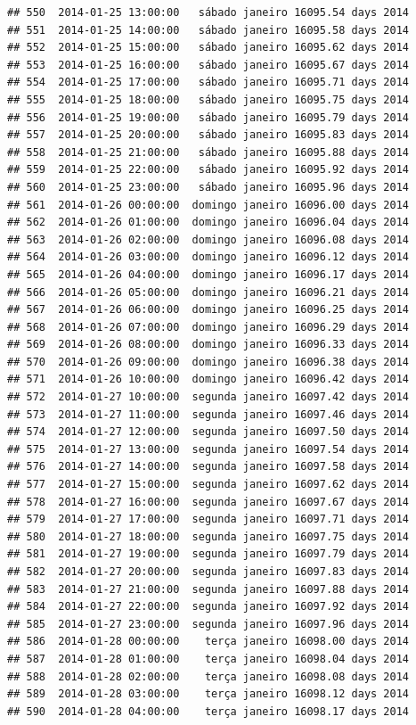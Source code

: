 \documentclass[]{book}
\begin{document}
\begin{verbatim}
## 550  2014-01-25 13:00:00   sábado janeiro 16095.54 days 2014
## 551  2014-01-25 14:00:00   sábado janeiro 16095.58 days 2014
## 552  2014-01-25 15:00:00   sábado janeiro 16095.62 days 2014
## 553  2014-01-25 16:00:00   sábado janeiro 16095.67 days 2014
## 554  2014-01-25 17:00:00   sábado janeiro 16095.71 days 2014
## 555  2014-01-25 18:00:00   sábado janeiro 16095.75 days 2014
## 556  2014-01-25 19:00:00   sábado janeiro 16095.79 days 2014
## 557  2014-01-25 20:00:00   sábado janeiro 16095.83 days 2014
## 558  2014-01-25 21:00:00   sábado janeiro 16095.88 days 2014
## 559  2014-01-25 22:00:00   sábado janeiro 16095.92 days 2014
## 560  2014-01-25 23:00:00   sábado janeiro 16095.96 days 2014
## 561  2014-01-26 00:00:00  domingo janeiro 16096.00 days 2014
## 562  2014-01-26 01:00:00  domingo janeiro 16096.04 days 2014
## 563  2014-01-26 02:00:00  domingo janeiro 16096.08 days 2014
## 564  2014-01-26 03:00:00  domingo janeiro 16096.12 days 2014
## 565  2014-01-26 04:00:00  domingo janeiro 16096.17 days 2014
## 566  2014-01-26 05:00:00  domingo janeiro 16096.21 days 2014
## 567  2014-01-26 06:00:00  domingo janeiro 16096.25 days 2014
## 568  2014-01-26 07:00:00  domingo janeiro 16096.29 days 2014
## 569  2014-01-26 08:00:00  domingo janeiro 16096.33 days 2014
## 570  2014-01-26 09:00:00  domingo janeiro 16096.38 days 2014
## 571  2014-01-26 10:00:00  domingo janeiro 16096.42 days 2014
## 572  2014-01-27 10:00:00  segunda janeiro 16097.42 days 2014
## 573  2014-01-27 11:00:00  segunda janeiro 16097.46 days 2014
## 574  2014-01-27 12:00:00  segunda janeiro 16097.50 days 2014
## 575  2014-01-27 13:00:00  segunda janeiro 16097.54 days 2014
## 576  2014-01-27 14:00:00  segunda janeiro 16097.58 days 2014
## 577  2014-01-27 15:00:00  segunda janeiro 16097.62 days 2014
## 578  2014-01-27 16:00:00  segunda janeiro 16097.67 days 2014
## 579  2014-01-27 17:00:00  segunda janeiro 16097.71 days 2014
## 580  2014-01-27 18:00:00  segunda janeiro 16097.75 days 2014
## 581  2014-01-27 19:00:00  segunda janeiro 16097.79 days 2014
## 582  2014-01-27 20:00:00  segunda janeiro 16097.83 days 2014
## 583  2014-01-27 21:00:00  segunda janeiro 16097.88 days 2014
## 584  2014-01-27 22:00:00  segunda janeiro 16097.92 days 2014
## 585  2014-01-27 23:00:00  segunda janeiro 16097.96 days 2014
## 586  2014-01-28 00:00:00    terça janeiro 16098.00 days 2014
## 587  2014-01-28 01:00:00    terça janeiro 16098.04 days 2014
## 588  2014-01-28 02:00:00    terça janeiro 16098.08 days 2014
## 589  2014-01-28 03:00:00    terça janeiro 16098.12 days 2014
## 590  2014-01-28 04:00:00    terça janeiro 16098.17 days 2014

\end{verbatim}
\end{document}
